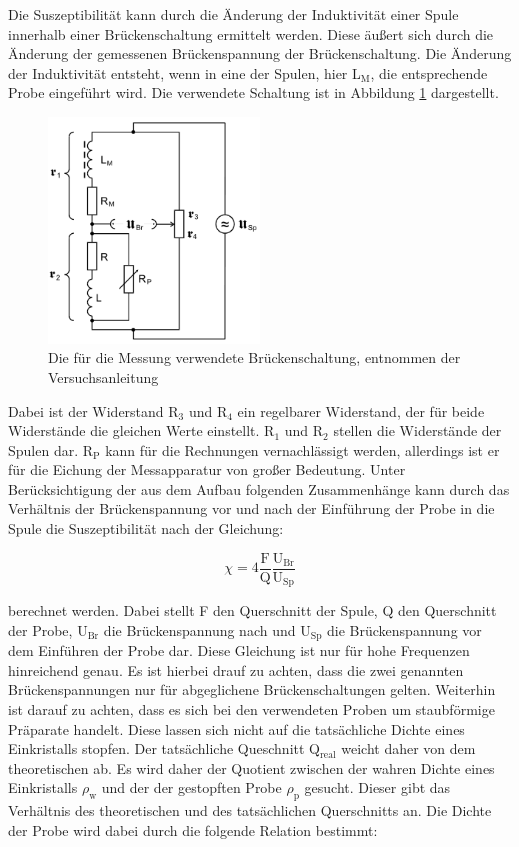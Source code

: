 Die Suszeptibilität kann durch die Änderung der Induktivität einer Spule innerhalb einer Brückenschaltung ermittelt werden.
Diese äußert sich durch die Änderung der gemessenen Brückenspannung der Brückenschaltung.
Die Änderung der Induktivität entsteht, wenn in eine der Spulen, hier L$_\text{M}$, die entsprechende Probe eingeführt wird.
Die verwendete Schaltung ist in Abbildung \ref{fig:Brückenschaltung} dargestellt.

\begin{figure}
  \centering
  \includegraphics[width=0.5\textwidth]{images/Brueckenschaltung.png}
  \caption{Die für die Messung verwendete Brückenschaltung, entnommen der Versuchsanleitung\cite[179]{sample}}
  \label{fig:Brückenschaltung}
\end{figure}

Dabei ist der Widerstand R$_3$ und R$_4$ ein regelbarer Widerstand, der für beide Widerstände die gleichen Werte einstellt.
R$_1$ und R$_2$ stellen die Widerstände der Spulen dar.
R$_\text{P}$ kann für die Rechnungen vernachlässigt werden, allerdings ist er für die Eichung der Messapparatur von großer Bedeutung.
Unter Berücksichtigung der aus dem Aufbau folgenden Zusammenhänge  kann durch das Verhältnis der Brückenspannung vor und nach der Einführung der Probe in die Spule die Suszeptibilität nach der Gleichung:

\begin{equation}
  \chi = 4 \frac{\text{F}}{\text{Q}} \frac{\text{U}_\text{Br}}{\text{U}_\text{Sp}}
  \label{eqn:chi1}
\end{equation}

berechnet werden.
Dabei stellt F den Querschnitt der Spule, Q den Querschnitt der Probe, $\text{U}_\text{Br}$ die Brückenspannung nach und $\text{U}_\text{Sp}$ die Brückenspannung vor dem Einführen der Probe dar.
Diese Gleichung ist nur für hohe Frequenzen hinreichend genau.
Es ist hierbei drauf zu achten, dass die zwei genannten Brückenspannungen nur für abgeglichene Brückenschaltungen gelten.
Weiterhin ist darauf zu achten, dass es sich bei den verwendeten Proben um staubförmige Präparate handelt.
Diese lassen sich nicht auf die tatsächliche Dichte eines Einkristalls stopfen.
Der tatsächliche Queschnitt Q$_\text{real}$ weicht daher von dem theoretischen ab.
Es wird daher der Quotient zwischen der wahren Dichte eines Einkristalls $\rho_\text{w}$ und der der gestopften Probe $\rho_\text{p}$ gesucht.
Dieser gibt das Verhältnis des theoretischen und des tatsächlichen Querschnitts an.
Die Dichte der Probe wird dabei durch die folgende Relation bestimmt:

